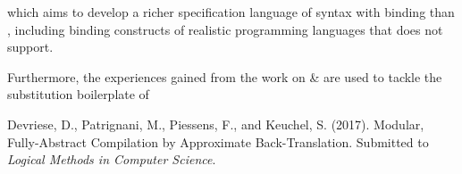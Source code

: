 {\noindent which aims to develop a richer specification language of syntax with
binding than \Knot, including binding constructs of realistic programming
languages that \Knot does not support.

Furthermore, the experiences gained from the work on \Needle \& \Knot are used
to tackle the substitution boilerplate of

\begin{center}
  \begin{minipage}{0.85\columnwidth}
    Devriese, D., Patrignani, M., Piessens, F., and Keuchel, S. (2017).
    \newblock Modular, {F}ully-{A}bstract {C}ompilation by {A}pproximate
      {B}ack-{T}ranslation.
    \newblock Submitted to {\em Logical Methods in Computer Science}.
  \end{minipage}
\end{center}


} %









